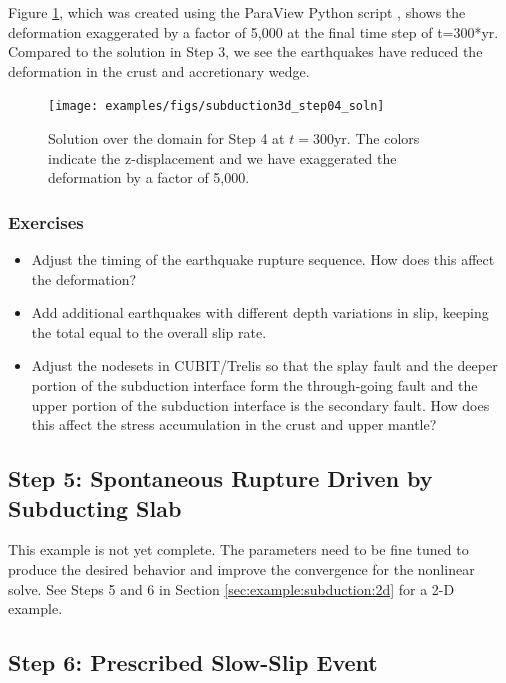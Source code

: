 Figure \ref{fig:example:subduction:3d:step04}, which was created
using the ParaView Python script , shows
the deformation exaggerated by a factor of 5,000 at the final time
step of t=300*yr. Compared to the solution in Step 3, we see the
earthquakes have reduced the deformation in the crust and accretionary
wedge.

\begin{figure}
  \texttt{[image: examples/figs/subduction3d\_step04\_soln]}
  \caption{Solution over the domain for Step 4 at $t=300 \mathrm{yr}$. The colors indicate
    the z-displacement and we have exaggerated the
    deformation by a factor of 5,000.}
  \label{fig:example:subduction:3d:step04}
\end{figure}

\subsubsection{Exercises}

\begin{itemize}
  \item Adjust the timing of the earthquake rupture sequence. How does
    this affect the deformation?
  \item Add additional earthquakes with different depth variations in
    slip, keeping the total equal to the overall slip rate.
  \item Adjust the nodesets in CUBIT/Trelis so that the splay fault
    and the deeper portion of the subduction interface form the
    through-going fault and the upper portion of the subduction
    interface is the secondary fault. How does this affect the stress
    accumulation in the crust and upper mantle?
\end{itemize}

\subsection{Step 5: Spontaneous Rupture Driven by Subducting Slab}

This example is not yet complete. The parameters need to be fine tuned
to produce the desired behavior and improve the convergence for the
nonlinear solve. See Steps 5 and 6 in Section
\vref{sec:example:subduction:2d} for a 2-D example.

\subsection{Step 6: Prescribed Slow-Slip Event}

